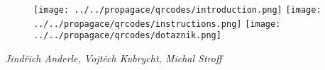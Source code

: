 \documentclass{../../style/mkimain}
\begin{document}
\noindent\begin{minipage}{\linewidth}
  \vspace{1cm}
  \begin{figure}[H]
        \texttt{[image: ../../propagace/qrcodes/introduction.png]}
      \endminipage\hfill
        \texttt{[image: ../../propagace/qrcodes/instructions.png]}
      \endminipage\hfill
        \texttt{[image: ../../propagace/qrcodes/dotaznik.png]}
      \endminipage
  \end{figure}
  \vspace{1,5cm}
  \begin{center}
    \textit{Jindřich Anderle, Vojtěch Kubrycht, Michal Stroff\\}
    \vspace{0.5cm}
    \color{blue}{kvantuminformaci@gmail.com}
  \end{center}
  \vspace*{\fill}
\end{minipage}
\end{document}
